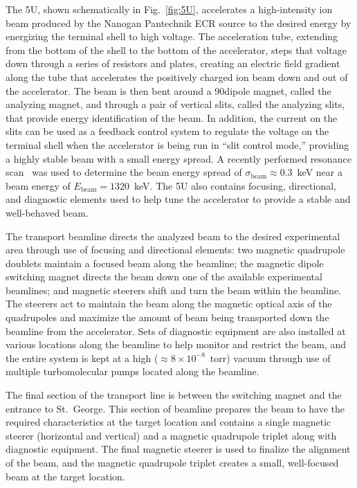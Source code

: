 The 5U, shown schematically in Fig.~\ref{fig:5U}, accelerates a high-intensity
ion beam produced by the Nanogan Pantechnik ECR source to the desired
energy by energizing the terminal shell to high voltage. The
acceleration tube, extending from the bottom of the shell to the bottom
of the accelerator, steps that voltage down through a series of
resistors and plates, creating an electric field gradient along the tube
that accelerates the positively charged ion beam down and out of the
accelerator. The beam is then bent around a 90\degree dipole magnet,
called the analyzing magnet, and through a pair of vertical slits,
called the analyzing slits, that provide energy identification of the
beam. In addition, the current on the slits can be used as a feedback
control system to regulate the voltage on the terminal shell when the
accelerator is being run in ``slit control mode,'' providing a highly
stable beam with a small energy spread. A recently performed
 resonance
scan~\cite{Gilardy2017} was used to determine the beam energy spread of
$\sigma_{\textrm{beam}} \approx 0.3$~keV near a beam energy of
$E_{\textrm{beam}} = 1320$~keV. The 5U also contains focusing,
directional, and diagnostic elements used to help tune the accelerator
to provide a stable and well-behaved beam.

The transport beamline directs the analyzed beam to the desired
experimental area through use of focusing and directional elements: two
magnetic quadrupole doublets maintain a focused beam along the beamline;
the magnetic dipole switching magnet directs the beam down one of the
available experimental beamlines; and magnetic steerers shift and turn
the beam within the beamline. The steerers act to maintain the beam
along the magnetic optical axis of the quadrupoles and maximize the
amount of beam being transported down the beamline from the accelerator.
Sets of diagnostic equipment are also installed at various locations
along the beamline to help monitor and restrict the beam, and the entire
system is kept at a high ($\approx 8\times 10^{-8}$~torr) vacuum through
use of multiple turbomolecular pumps located along the beamline.

The final section of the transport line is between the switching magnet
and the entrance to St.\ George. This section of beamline prepares the
beam to have the required characteristics at the target location and
contains a single magnetic steerer (horizontal and vertical) and a
magnetic quadrupole triplet along with diagnostic equipment. The final
magnetic steerer is used to finalize the alignment of the beam, and the
magnetic quadrupole triplet creates a small, well-focused beam at the
target location.



